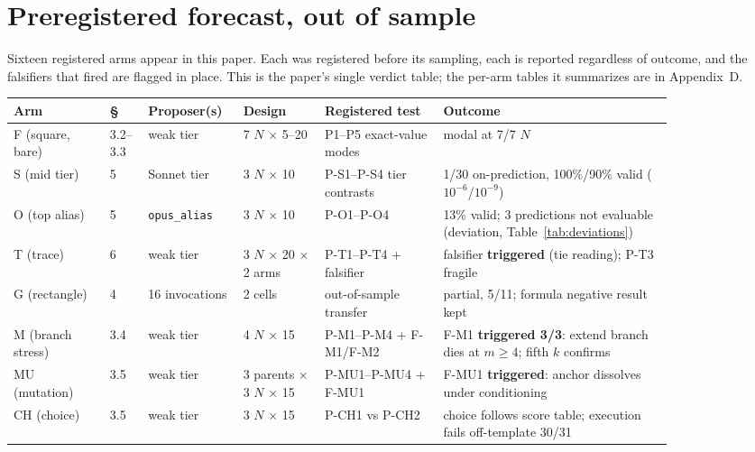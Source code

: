 \section{Preregistered forecast, out of sample}

Sixteen registered arms appear in this paper. Each was registered before its sampling, each
is reported regardless of outcome, and the falsifiers that fired are flagged in place. This is
the paper's single verdict table; the per-arm tables it summarizes are in Appendix~D.

\begin{center}
\begin{scriptsize}
\setlength{\tabcolsep}{3pt}
\begin{tabular}{@{}p{0.13\linewidth}p{0.04\linewidth}p{0.10\linewidth}p{0.11\linewidth}p{0.16\linewidth}p{0.31\linewidth}@{}}
\toprule
Arm & \S & Proposer(s) & Design & Registered test & Outcome \\
\midrule
F (square, bare) & 3.2--3.3 & weak tier & 7 $N$ $\times$ 5--20 & P1--P5 exact-value modes & modal at 7/7 $N$ \\
S (mid tier) & 5 & Sonnet tier & 3 $N$ $\times$ 10 & P-S1--P-S4 tier contrasts & 1/30 on-prediction, 100\%/90\% valid ($10^{-6}$/$10^{-9}$) \\
O (top alias) & 5 & \texttt{opus\_alias} & 3 $N$ $\times$ 10 & P-O1--P-O4 & 13\% valid; 3 predictions not evaluable (deviation, Table~\ref{tab:deviations}) \\
T (trace) & 6 & weak tier & 3 $N$ $\times$ 20 $\times$ 2 arms & P-T1--P-T4 + falsifier & falsifier \textbf{triggered} (tie reading); P-T3 fragile \\
G (rectangle) & 4 & 16 invocations & 2 cells & out-of-sample transfer & partial, 5/11; formula negative result kept \\
M (branch stress) & 3.4 & weak tier & 4 $N$ $\times$ 15 & P-M1--P-M4 + F-M1/F-M2 & F-M1 \textbf{triggered 3/3}: extend branch dies at $m \ge 4$; fifth $k$ confirms \\
MU (mutation) & 3.5 & weak tier & 3 parents $\times$ 3 $N$ $\times$ 15 & P-MU1--P-MU4 + F-MU1 & F-MU1 \textbf{triggered}: anchor dissolves under conditioning \\
CH (choice) & 3.5 & weak tier & 3 $N$ $\times$ 15 & P-CH1 vs P-CH2 & choice follows score table; execution fails off-template 30/31 \\

\end{tabular}
\end{scriptsize}
\end{center}

